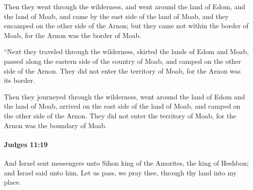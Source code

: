 			\begin{versebox}
					\item[BHS] 
					\item[ASV] Then they went through the wilderness, and went around the land of Edom, and the land of Moab, and came by the east side of the land of Moab, and they encamped on the other side of the Arnon; but they came not within the border of Moab, for the Arnon was the border of Moab.
					\item[NIV] “Next they traveled through the wilderness, skirted the lands of Edom and Moab, passed along the eastern side of the country of Moab, and camped on the other side of the Arnon. They did not enter the territory of Moab, for the Arnon was its border.
					\item[NRSV] Then they journeyed through the wilderness, went around the land of Edom and the land of Moab, arrived on the east side of the land of Moab, and camped on the other side of the Arnon. They did not enter the territory of Moab, for the Arnon was the boundary of Moab.
			\end{versebox}

		\paragraph{Judges 11:19} %
			\label{JUDGES-11-19}

			And Israel sent messengers unto Sihon king of the Amorites, the king of Heshbon; and Israel said unto him, Let us pass, we pray thee, through thy land into my place.


